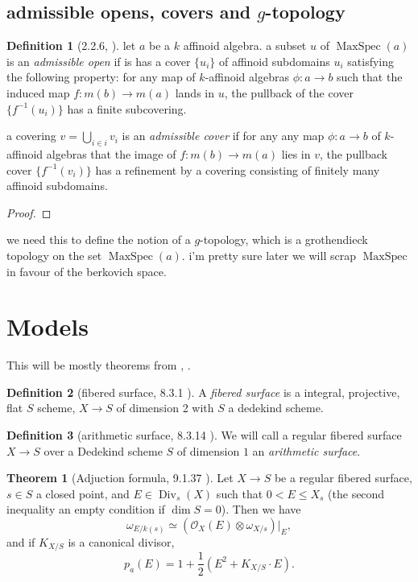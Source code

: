 \documentclass[a4paper]{report}
\DeclareMathOperator{\divisor}{Div}
\DeclareMathOperator{\maxspec}{MaxSpec}
\theoremstyle{definition}
\newtheorem*{theorem}{Theorem}
\newtheorem*{definition}{Definition}
\begin{document}
\subsection{admissible opens, covers and $g$-topology} \label{sec:admissible_opens,_covers_and_g-topology}

\begin{definition}
	[2.2.6, \cite{conrad2008several}]
	let $a$ be a  $k$ affinoid algebra. 
	a subset $u$ of $\maxspec(a)$ is an \emph{admissible open} if is has a cover $\{u_i\} $ of affinoid subdomains $u_i$ satisfying the following property: 
	for any map of $k$-affinoid algebras $\phi: a \to b$ such that the induced map $f: m(b) \to m(a)$ lands in $u$, the pullback of the cover $\{f^{-1}(u_i)\} $ has a finite subcovering. 


	a covering $v = \bigcup_{i \in  i} v_i$ is an \emph{admissible cover} if for any any map $\phi:a \to b$  of $k$-affinoid algebras that the image of  $f: m(b) \to m(a)$ lies in $v$, the pullback cover $\{f^{-1}(v_i)\} $ has a refinement by a covering consisting of finitely many affinoid subdomains.  
\end{definition}
\begin{proof}
\end{proof}

we need this to define the notion of a $g$-topology, which is a grothendieck topology on the set $\maxspec(a)$. 
i'm pretty sure later we will scrap $\maxspec$ in favour of the berkovich space.




\section{Models} \label{sec:models}


This will be mostly theorems from \cite{liu}, \cite{silvermanarithmetic}.


\begin{definition}
	[fibered surface, 8.3.1 \cite{liu}]
	A \emph{fibered surface} is a integral, projective, flat $S$ scheme, $X \to S$ of dimension 2 with $S$ a dedekind scheme. 
\end{definition}
\begin{definition}
	[arithmetic surface, 8.3.14 \cite{liu}]
We will call a regular fibered surface $X \to S$ over a Dedekind scheme $S$ of dimension $1$ an \emph{arithmetic surface}.
\end{definition}

\begin{theorem}
	[Adjuction formula, 9.1.37 \cite{liu}] 
	Let $X \to S$ be a regular fibered surface, $s \in S$ a closed point, and $E \in \divisor_s(X)$	such that $0 < E \le X_s$ (the second inequality an empty condition if $\dim S =0$). 
	Then we have \[
		\omega_{E / k(s)} \simeq (\mathcal{O}_X(E) \otimes \omega_{X / s})|_E
	,\] 
	and if $K_{X / S}$ is a canonical divisor, \[
		p_a(E) = 1 + \frac{1}{2}(E^2 + K_{X / S} \cdot E)
	.\] 

\end{theorem}
\end{document}
